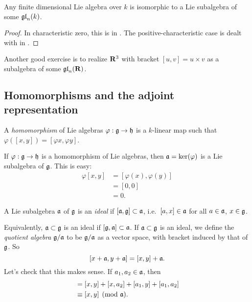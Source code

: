 \begin{theorem}[Ado]
Any finite dimensional Lie algebra over $k$ is isomorphic to a Lie subalgebra 
of some $\mathfrak{gl}_n(k)$. 
\end{theorem}
\begin{proof}
In characteristic zero, this is in \cite[I \S 7.3]{bourbaki-lie-alg-1-3}. The 
positive-characteristic case is dealt with in \cite[VI \S3]{jacobson-1979}.
\end{proof}

Another good exercise is to realize $\mathbf{R}^3$ with bracket $[u,v]=u\times v$ as 
a subalgebra of some $\mathfrak{gl}_n(\mathbf{R})$. 





\subsection{Homomorphisms and the adjoint representation}

\begin{definition}
A \emph{homomorphism} of Lie algebras $\varphi:\mathfrak{g}\to \mathfrak{h}$ is a $k$-linear map 
such that $\varphi([x,y])=[\varphi x,\varphi y]$. 
\end{definition}

If $\varphi:\mathfrak{g}\to \mathfrak{h}$ is a homomorphism of Lie algebras, then 
$\mathfrak{a}=\ker(\varphi)$ is a Lie subalgebra of $\mathfrak{g}$. This is easy: 
\begin{align*}
  \varphi[x,y]
    &= [\varphi(x),\varphi(y)] \\
    &= [0,0] \\
    &= 0 .
\end{align*}

\begin{definition}
A Lie subalgebra $\mathfrak{a}$ of $\mathfrak{g}$ is an \emph{ideal} if 
$[\mathfrak{a},\mathfrak{g}]\subset \mathfrak{a}$, i.e.~$[a,x]\in \mathfrak{a}$ for all $a\in \mathfrak{a}$, $x\in \mathfrak{g}$. 
\end{definition}

Equivalently, $\mathfrak{a}\subset \mathfrak{g}$ is an ideal if $[\mathfrak{g},\mathfrak{a}]\subset \mathfrak{a}$. If 
$\mathfrak{a}\subset \mathfrak{g}$ is an ideal, we define the \emph{quotient algebra} $\mathfrak{g}/\mathfrak{a}$ 
to be $\mathfrak{g}/\mathfrak{a}$ as a vector space, with bracket induced by that of $\mathfrak{g}$. So 
\[
  [x+\mathfrak{a},y+\mathfrak{a}] = [x,y]+\mathfrak{a} .
\]
Let's check that this makes sense. If $a_1,a_2\in \mathfrak{a}$, then 
\begin{align*}
  [x+a_1,x+a_2] 
    &= [x,y] + [x,a_2]+[a_1,y]+[a_1,a_2] \\
    &\equiv [x,y] \pmod \fa .
\end{align*}

